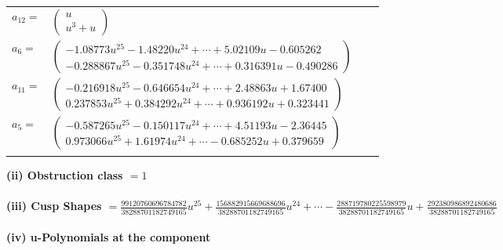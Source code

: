 \documentclass[1p]{elsarticle_modified}
\theoremstyle{definition}
\begin{document}
\begin{tabular}{m{7pt} m{180pt} m{7pt} m{180pt} }
\flushright $a_{12}=$&$\begin{pmatrix}u\\u^3+u\end{pmatrix}$ \\
\flushright $a_{6}=$&$\begin{pmatrix}-1.08773 u^{25}-1.48220 u^{24}+\cdots+5.02109 u-0.605262\\-0.288867 u^{25}-0.351748 u^{24}+\cdots+0.316391 u-0.490286\end{pmatrix}$ \\
\flushright $a_{11}=$&$\begin{pmatrix}-0.216918 u^{25}-0.646654 u^{24}+\cdots+2.48863 u+1.67400\\0.237853 u^{25}+0.384292 u^{24}+\cdots+0.936192 u+0.323441\end{pmatrix}$ \\
\flushright $a_{5}=$&$\begin{pmatrix}-0.587265 u^{25}-0.150117 u^{24}+\cdots+4.51193 u-2.36445\\0.973066 u^{25}+1.61974 u^{24}+\cdots-0.685252 u+0.379659\end{pmatrix}$\\&\end{tabular}
\flushleft \textbf{(ii) Obstruction class $= 1$}\\~\\
\flushleft \textbf{(iii) Cusp Shapes $= \frac{99120760696784782}{38288701182749165} u^{25}+\frac{156882915669688696}{38288701182749165} u^{24}+\cdots-\frac{288719780225598979}{38288701182749165} u+\frac{292380986892480686}{38288701182749165}$}\\~\\
\newpage\renewcommand{\arraystretch}{1}
\flushleft \textbf{(iv) u-Polynomials at the component}\newline \\
\end{document}
